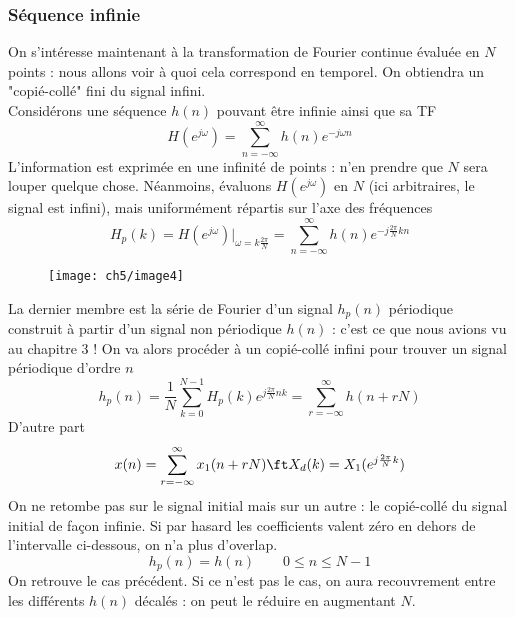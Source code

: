 		\subsubsection{Séquence infinie}
		On s'intéresse maintenant à la transformation de Fourier continue évaluée en $N$ points : 
		nous allons voir à quoi cela correspond en temporel. On obtiendra un "copié-collé" fini du 
		signal infini.\\
		Considérons une séquence $h(n)$ pouvant être infinie ainsi que sa TF
		\begin{equation}
		H(e^{j\omega}) = \sum_{n=-\infty}^\infty h(n)e^{-j\omega n}
		\end{equation}
		L'information est exprimée en une infinité de points : n'en prendre que $N$ sera louper 
		quelque chose. Néanmoins, évaluons $H(e^{j\omega})$ en $N$ (ici arbitraires, le signal est 
		infini), mais uniformément répartis sur l'axe des fréquences
		\begin{equation}
		H_p(k) = H(e^{j\omega})|_{\omega=k\frac{2\pi}{N}} = \sum_{n=-\infty}^\infty h(n)e^{-j\frac{2\pi}{
		N}kn}
		\end{equation}
\vspace{-5mm}
			\begin{wrapfigure}[22]{l}{7cm}
		\texttt{[image: ch5/image4]}
	\end{wrapfigure}	
		La dernier membre est la série de Fourier d'un signal $h_p(n)$ périodique construit à partir d'un 
		signal non périodique $h(n)$ : c'est ce que nous avions vu au chapitre 3 ! On va alors procéder 
		à un copié-collé infini pour trouver un signal périodique d'ordre $n$
		\begin{equation}
		h_p(n) = \frac{1}{N}\sum_{k=0}^{N-1} H_p(k)e^{j\frac{2\pi}{N}nk} = \sum_{r=-\infty}^\infty h(n+rN)
		\end{equation}
		D'autre part
		\begin{equation}
		x(n) = \sum_{r=-\infty}^\infty x_1(n+rN) \ft X_d(k) = X_1(e^{j\frac{2\pi}{N}k})
		\end{equation}
		On ne retombe pas sur le signal initial mais sur un autre : le copié-collé du signal initial 
		de façon infinie. Si par hasard les coefficients valent zéro en dehors de l'intervalle 
		ci-dessous, on n'a plus d'overlap.
		\begin{equation}
		h_p (n) = h(n)\qquad 0\leq n \leq N-1
		\end{equation}
		On retrouve le cas précédent. Si ce n'est pas le cas, on aura recouvrement entre les différents 
		$h(n)$ décalés : on peut le réduire en augmentant $N$.

